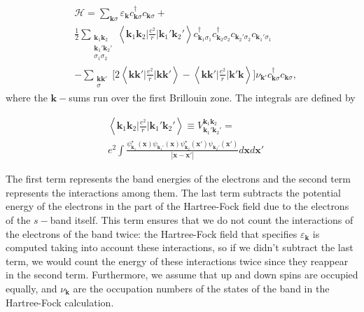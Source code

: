 \documentclass[10pt, twocolumn, twoside]{article}
\begin{document}
\begin{equation}\label{eq:startingHamiltonian}
\begin{split}
&\mathcal{H} = \sum_{\bm k \sigma} \varepsilon_{\bm k} c_{\bm k \sigma}^\dagger c_{\bm k \sigma} + \\
&\frac{1}{2} \sum_{ \substack{\bm k_1 \bm k_2 \\ \bm k_1' \bm k_2' \\ \sigma_1 \sigma_2 } } \left\langle \bm k_1 \bm k_2 \bigg| \frac{e^2}{r} \bigg| \bm k_1' \bm k_2' \right\rangle 
 c_{\bm k_1 \sigma_1}^\dagger c_{\bm k_2 \sigma_2}^\dagger c_{\bm k_2' \sigma_2} c_{\bm k_1' \sigma_1} \\
 &- \sum_{ \substack{\bm k \bm k' \\ \sigma} } \bigg[ 2 \left\langle \bm k \bm k' \bigg| \frac{e^2}{r} \bigg| \bm k \bm k' \right\rangle - \left\langle \bm k \bm k' \bigg| \frac{e^2}{r} \bigg| \bm k' \bm k \right\rangle \bigg] \nu_{\bm k'} c_{\bm k \sigma}^\dagger c_{\bm k \sigma} ,
\end{split}
\end{equation}
where the $\bm k-$sums run over the first Brillouin zone. The integrals are defined by

\begin{equation}\label{eq:integrals}
\begin{split}
&\left\langle \bm k_1 \bm k_2 \bigg| \frac{e^2}{r} \bigg| \bm k_1' \bm k_2' \right\rangle \equiv V^{\bm k_1 \bm k_2}_{\bm k_1' \bm k_2'}  =  \\
&e^2 \int \frac{\psi_{\bm k_1}^\star (\bm x) \psi_{\bm k_1'} (\bm x) \psi_{\bm k_2}^\star (\bm x') \psi_{\bm k_2'}(\bm x') }{| \bm x - \bm x' |} d\bm x d\bm x'
\end{split}
\end{equation}

The first term represents the band energies of the electrons and the second term represents the interactions among them. The last term subtracts the potential energy of the electrons in the part of the Hartree-Fock field due to the electrons of the $s-$band itself. This term ensures that we do not count the interactions of the electrons of the band twice: the Hartree-Fock field that specifies $\varepsilon_{\bm k}$ is computed taking into account these interactions, so if we didn't subtract the last term, we would count the energy of these interactions twice since they reappear in the second term. Furthermore, we assume that up and down spins are occupied equally, and $\nu_{\bm k}$ are the occupation numbers of the states of the band in the Hartree-Fock calculation. 
\end{document}
